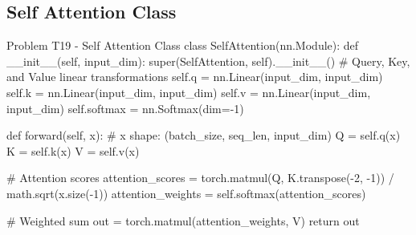 \documentclass[12pt, a4paper]{article}
\begin{document}
            \subsection{Self Attention Class}
                \begin{codeblock}{Problem T19 - Self Attention Class}
                    class SelfAttention(nn.Module):
                        def __init__(self, input_dim):
                            super(SelfAttention, self).__init__()
                            # Query, Key, and Value linear transformations
                            self.q = nn.Linear(input_dim, input_dim)
                            self.k = nn.Linear(input_dim, input_dim)
                            self.v = nn.Linear(input_dim, input_dim)
                            self.softmax = nn.Softmax(dim=-1)

                        def forward(self, x):
                            # x shape: (batch_size, seq_len, input_dim)
                            Q = self.q(x)
                            K = self.k(x)
                            V = self.v(x)

                            # Attention scores
                            attention_scores = torch.matmul(Q, K.transpose(-2, -1)) / math.sqrt(x.size(-1))
                            attention_weights = self.softmax(attention_scores)
                            
                            # Weighted sum
                            out = torch.matmul(attention_weights, V)
                            return out
                \end{codeblock}
            
	\pagebreak
\end{document}
